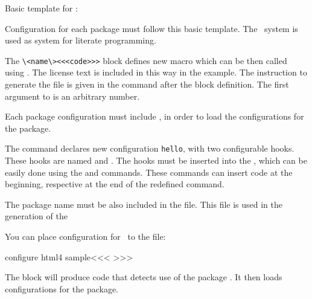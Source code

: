 Basic template for :


Configuration for each package must follow this basic template. The \ProTeX\ system is used as system for literate programming.

The \verb|\<name\><<<code>>>| block defines new macro which can be then called using . The license text
is included in this way in the example. The instruction to generate the  file is given in the 
command  after the block definition. The first argument to  is an arbitrary number.


Each package configuration  must include , in order to load the configurations for the package.

The command  declares new configuration \texttt{hello}, with two configurable hooks. 
These hooks are named   and . The hooks must be inserted into the 
\texcommand{\hello}, which can be easily done using the  and  commands. These
commands can insert code  at the beginning, respective at the end of the redefined command.

The package name must be also included in the  file. This file is used in the generation of the 

\begin{texsource}
\end{texsource}

You can place configuration for \HTML\ to the  file:

\begin{texsource}
\<configure html4 sample\><<<
>>>
\end{texsource}

The  block will produce code that 
detects use of the package . It then loads configurations
for the package.


